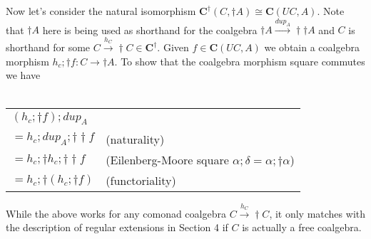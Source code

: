 \documentclass{article}
\newcommand{\mbf}{\mathbf}
\begin{document}
Now let's consider the natural isomorphism $\mbf{C}^\dagger(C,\dagger A) \cong \mbf{C}(UC,A)$. Note that
$\dagger A$ here is being used as shorthand for the coalgebra 
$\dagger A \overset{\mathit{dup}_A}{\longrightarrow} \dagger \dagger A$ and $C$ is shorthand for some $C \overset{h_C}{\longrightarrow} \dagger C \in \mathbf{C}^\dagger$. Given $f \in \mbf{C}(UC,A)$ we obtain a coalgebra morphism
$h_c;\dagger f : C \to \dagger A$. To show that the coalgebra morphism square commutes we have\\~\\
\begin{tabular}{ll}
$(h_c;\dagger f);\mathit{dup}_A$ & ~ \\
$= h_c;\mathit{dup}_A;\dagger \dagger f$ & (naturality)  \\
$= h_c;\dagger h_c;\dagger \dagger f$ & (Eilenberg-Moore square $\alpha;\delta = \alpha;\dagger\alpha$) \\
$= h_c;\dagger(h_c;\dagger f)$ & (functoriality)
\end{tabular}

While the above works for any comonad coalgebra $C \overset{h_C}{\longrightarrow} \dagger C$, it only matches with the description of regular extensions in Section 4 if $C$ is actually a free coalgebra.
\end{document}
